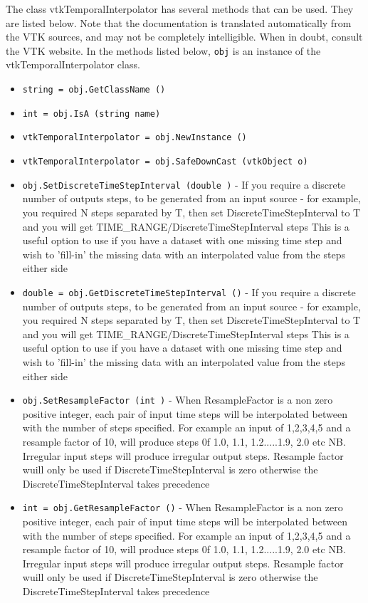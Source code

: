 The class vtkTemporalInterpolator has several methods that can be used.
  They are listed below.
Note that the documentation is translated automatically from the VTK sources,
and may not be completely intelligible.  When in doubt, consult the VTK website.
In the methods listed below, \verb|obj| is an instance of the vtkTemporalInterpolator class.
\begin{itemize}
\item  \verb|string = obj.GetClassName ()|

\item  \verb|int = obj.IsA (string name)|

\item  \verb|vtkTemporalInterpolator = obj.NewInstance ()|

\item  \verb|vtkTemporalInterpolator = obj.SafeDownCast (vtkObject o)|

\item  \verb|obj.SetDiscreteTimeStepInterval (double )| -  If you require a discrete number of outputs steps, to be 
 generated from an input source - for example, you required
 N steps separated by T, then set DiscreteTimeStepInterval to T
 and you will get TIME\_RANGE/DiscreteTimeStepInterval steps
 This is a useful option to use if you have a dataset with one
 missing time step and wish to 'fill-in' the missing data
 with an interpolated value from the steps either side

\item  \verb|double = obj.GetDiscreteTimeStepInterval ()| -  If you require a discrete number of outputs steps, to be 
 generated from an input source - for example, you required
 N steps separated by T, then set DiscreteTimeStepInterval to T
 and you will get TIME\_RANGE/DiscreteTimeStepInterval steps
 This is a useful option to use if you have a dataset with one
 missing time step and wish to 'fill-in' the missing data
 with an interpolated value from the steps either side

\item  \verb|obj.SetResampleFactor (int )| -  When ResampleFactor is a non zero positive integer, each pair
 of input time steps will be interpolated between with the number
 of steps specified. For example an input of 1,2,3,4,5 and a resample factor
 of 10, will produce steps 0f 1.0, 1.1, 1.2.....1.9, 2.0 etc
 NB. Irregular input steps will produce irregular output steps.
 Resample factor wuill only be used if DiscreteTimeStepInterval is zero
 otherwise the DiscreteTimeStepInterval takes precedence

\item  \verb|int = obj.GetResampleFactor ()| -  When ResampleFactor is a non zero positive integer, each pair
 of input time steps will be interpolated between with the number
 of steps specified. For example an input of 1,2,3,4,5 and a resample factor
 of 10, will produce steps 0f 1.0, 1.1, 1.2.....1.9, 2.0 etc
 NB. Irregular input steps will produce irregular output steps.
 Resample factor wuill only be used if DiscreteTimeStepInterval is zero
 otherwise the DiscreteTimeStepInterval takes precedence

\end{itemize}
